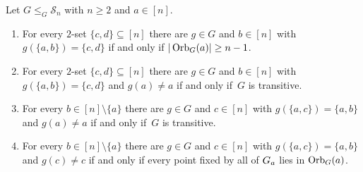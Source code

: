 \begin{corollary} \label{prelim:cor:two-set-global}
	Let $G \le_G \mathcal S_n$ with $n \ge 2$ and $a \in [n]$.
	\begin{enumerate}
		\item \label{prelim:cor:two-set-global:1} \label{prelim:lem:2sets-transitive}
		For every $2$-set $\{c,d\} \subseteq [n]$ there are $g \in G$ and $b \in [n]$ with
		$g(\{a,b\}) = \{c,d\}$ if and only if $|\Orbit{a}{G}| \ge n - 1$.
		
		\item \label{prelim:cor:two-set-global:2} For every $2$-set $\{c,d\} \subseteq [n]$ there are
		$g \in G$ and $b \in [n]$ with $g(\{a,b\}) = \{c,d\}$ and $g(a) \ne a$ if and only if~$G$ is
		transitive.
		
		\item \label{prelim:cor:two-set-global:3} For every $b \in [n] \setminus \{a\}$ there are
		$g \in G$ and $c \in [n]$ with $g(\{a,c\}) = \{a,b\}$ and $g(a) \ne a$ if and only if~$G$ is
		transitive.
		
		\item \label{prelim:cor:two-set-global:4} For every $b \in [n] \setminus \{a\}$ 
		there are
		$g \in G$ and $c \in [n]$ 
		with $g(\{a,c\}) = \{a,b\}$ and $g(c) \ne c$ 
		if and only if every point fixed by all 
		of $\Stab{a}{G}$ lies in $\Orbit{a}{G}$.
	\end{enumerate}
\end{corollary}
